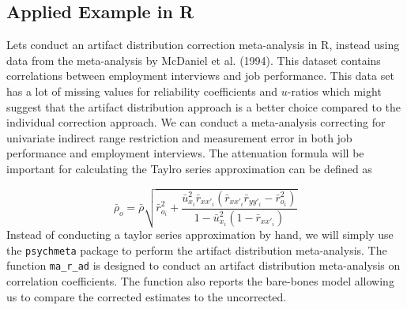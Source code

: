 \documentclass[
  letterpaper,
  DIV=11,
  numbers=noendperiod]{scrreprt}
\begin{document}
\hypertarget{applied-example-in-r-1}{%
\subsection{Applied Example in R}\label{applied-example-in-r-1}}

Lets conduct an artifact distribution correction meta-analysis in R,
instead using data from the meta-analysis by McDaniel et al. (1994).
This dataset contains correlations between employment interviews and job
performance. This data set has a lot of missing values for reliability
coefficients and \(u\)-ratios which might suggest that the artifact
distribution approach is a better choice compared to the individual
correction approach. We can conduct a meta-analysis correcting for
univariate indirect range restriction and measurement error in both job
performance and employment interviews. The attenuation formula will be
important for calculating the Taylro series approximation can be defined
as

\[
\bar{\rho}_o=\bar{\rho}\sqrt{\bar{r}_{o_i}^2 + \frac{\bar{u}_{x_i}^2 \bar{r}_{xx'_i}(\bar{r}_{xx'_i}\bar{r}_{yy'_i} - \bar{r}_{o_i}^2) }{1 - \bar{u}_{x_i}^2 (1-\bar{r}_{xx'_i})} }
\] Instead of conducting a taylor series approximation by hand, we will
simply use the \texttt{psychmeta} package to perform the artifact
distribution meta-analysis. The function \texttt{ma\_r\_ad} is designed
to conduct an artifact distribution meta-analysis on correlation
coefficients. The function also reports the bare-bones model allowing us
to compare the corrected estimates to the uncorrected.
\end{document}

